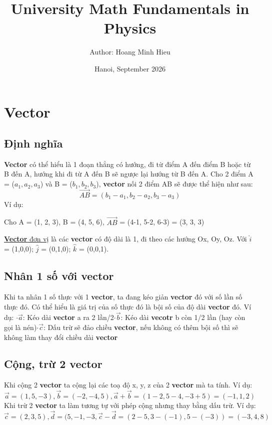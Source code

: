 \documentclass{article}
\title{University Math Fundamentals in Physics}
\author{Author: Hoang Minh Hieu}
\date{Hanoi, September 2026}
\begin{document}
\section{Vector}
\subsection{Định nghĩa}
\textbf{Vector} có thể hiểu là 1 đoạn thẳng có hướng, đi từ điểm A đến điểm B hoặc từ B đến A, hướng khi đi từ A đến B sẽ ngược lại hướng từ B đến A.\newline
Cho 2 điểm A = ($a_1, a_2,a_3$) và B = ($b_1,b_2,b_3$), \textbf{vector} nối 2 điểm AB sẽ được thể hiện như sau: 
\[\vec{AB}=(b_1-a_1, b_2-a_2,b_3-a_3)\]
Ví dụ: 
\begin{center}
     Cho A = (1, 2, 3), B = (4, 5, 6), $\vec{AB}$ = (4-1, 5-2, 6-3) = (3, 3, 3)
\end{center}
\underline{\textbf{Vector} đơn vị} là các \textbf{vector} có độ dài là 1, đi theo các hướng Ox, Oy, Oz. Với $\hat{i}$ = (1,0,0); $\hat{j}$ = (0,1,0); $\hat{k}$ = (0,0,1).

\subsection{Nhân 1 số với \textbf{vector}}
Khi ta nhân 1 số thực với 1 \textbf{vector}, ta đang kéo giản \textbf{vector} đó với số lần số thực đó. Có thể hiểu là giá trị của số thực đó là bội số của độ dài \textbf{vector} đó. \newline
Ví dụ: $\cdot\vec{a}$: Kéo dài \textbf{vector} a ra 2 lần/2$\cdot\vec{b}$: Kéo dài \textbf{vecotr} b còn 1/2 lần (hay còn gọi là nén)$\cdot\vec{c}$: Dấu trừ sẽ đảo chiều \textbf{vector}, nếu không có thêm bội số thì sẽ không làm thay đổi chiều dài \textbf{vector}

\subsection{Cộng, trừ 2 vector}
Khi cộng 2 \textbf{vector} ta cộng lại các toạ độ x, y, z của 2 \textbf{vector} mà ta tính.\newline
Ví dụ: 
\[\vec{a}=(1,5,-3),\vec{b}=(-2,-4,5),\vec{a}+\vec{b}=(1-2,5-4,-3+5)=(-1,1,2)\]
Khi trừ 2 \textbf{vector} ta làm tương tự với phép cộng nhưng thay bằng dấu trừ.\newline
Ví dụ: 
\[\vec{c}=(2,3,5),\vec{d}=(5,-1,-3, \vec{c}-\vec{d}=(2-5,3-(-1),5-(-3))=(-3,4,8)\]
\end{document}
